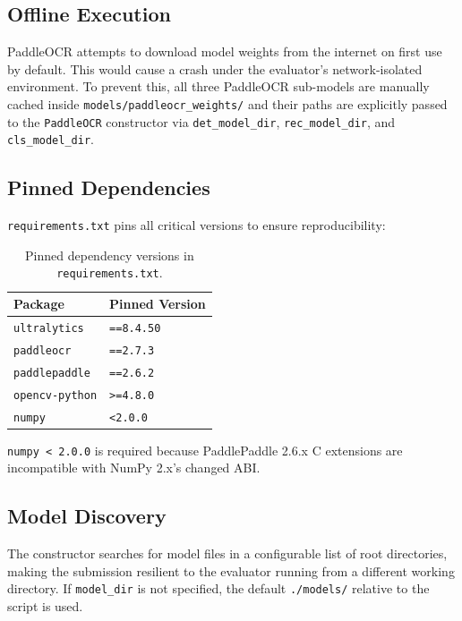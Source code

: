 \documentclass[12pt,a4paper]{article}
\begin{document}
\subsection{Offline Execution}
PaddleOCR attempts to download model weights from the internet on first use by default.
This would cause a crash under the evaluator's network-isolated environment. To prevent
this, all three PaddleOCR sub-models are manually cached inside
\texttt{models/paddleocr\_weights/} and their paths are explicitly passed to the
\texttt{PaddleOCR} constructor via \texttt{det\_model\_dir}, \texttt{rec\_model\_dir},
and \texttt{cls\_model\_dir}.

\subsection{Pinned Dependencies}
\texttt{requirements.txt} pins all critical versions to ensure reproducibility:

\begin{table}[h]
\centering
\begin{tabular}{ll}
\toprule
\textbf{Package} & \textbf{Pinned Version} \\
\midrule
\texttt{ultralytics}    & \texttt{==8.4.50}    \\
\texttt{paddleocr}      & \texttt{==2.7.3}     \\
\texttt{paddlepaddle}   & \texttt{==2.6.2}     \\
\texttt{opencv-python}  & \texttt{>=4.8.0}     \\
\texttt{numpy}          & \texttt{<2.0.0}      \\
\bottomrule
\end{tabular}
\caption{Pinned dependency versions in \texttt{requirements.txt}.}
\end{table}

\texttt{numpy < 2.0.0} is required because PaddlePaddle 2.6.x C extensions are
incompatible with NumPy 2.x's changed ABI.

\subsection{Model Discovery}
The constructor searches for model files in a configurable list of root directories,
making the submission resilient to the evaluator running from a different working
directory. If \texttt{model\_dir} is not specified, the default \texttt{./models/}
relative to the script is used.

\end{document}
